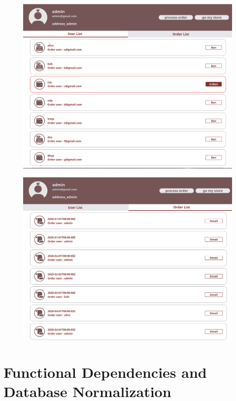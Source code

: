 \documentclass[a4paper, 12pt]{article}
\begin{document}
\begin{figure}[hp]
    \centerline{\includegraphics[width=40em]{gui-snapshot/admin/user.png}}
    \label{fig:enter-label}
\end{figure}
\newpage
{}
\begin{figure}[hp]
    \centerline{\includegraphics[width=40em]{gui-snapshot/admin/order.png}}
    \label{fig:enter-label}
\end{figure}

\newpage

\section{Functional Dependencies and Database Normalization}
\end{document}
